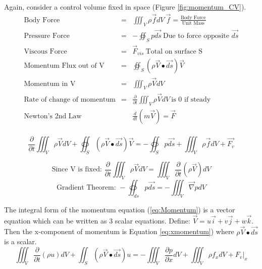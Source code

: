 \documentclass[draft=false, titlepage]{article}
\newcommand{\gradient}{\vec{\nabla}}
\newcommand{\deldelt}{\frac{\partial}{\partial t}}
\newcommand{\volumeint}{\iiint_V}
\begin{document}
Again, consider a control volume fixed in space (Figure \ref{fig:momentum_CV}).
\begin{equation*}
    \renewcommand{\arraystretch}{1.5}
    \begin{array}{rcl}
         \text{Body Force} &=& \iiint_V \rho \vec{f} dV\ \vec{f} = \frac{\text{Body Force}}{\text{Unit Mass}} \\
         
         \text{Pressure Force} &=& -\oiint_S p\vec{ds}\ \text{Due to force opposite } \vec{ds} \\
         
         \text{Viscous Force} &=& \vec{F}_{vis}\ \text{Total on surface S} \\
         
         \text{Momentum Flux out of V} &=& \oiint_S (\rho \vec{V} \bullet \vec{ds}) \vec{V} \\
         
         \text{Momentum in V} &=& \iiint_V \rho \vec{V} dV \\
         
         \text{Rate of change of momentum} &=& \deldelt \volumeint \rho \vec{V} dV\ \text{is 0 if steady} \\
         
         \text{Newton's 2nd Law} & & \frac{d}{dt}(m\vec{V}) = \vec{F} \\
    \end{array}
\end{equation*}

\begin{equation}
    \boxed{ \deldelt \volumeint \rho \vec{V} dV + \oiint_S (\rho \vec{V} \bullet \vec{ds}) \vec{V} = -\oiint_S p \vec{ds} + \volumeint \rho \vec{f} dV + \vec{F_v} }
    \label{eq:Momentum}
\end{equation}

\begin{equation*}
    \text{Since V is fixed: } \deldelt \volumeint \rho \vec{V} dV = \volumeint \deldelt (\rho \vec{V}) dV
\end{equation*}
\begin{equation*}
    \text{Gradient Theorem: } -\oiint_{ds} p\vec{ds} = -\volumeint \gradient p dV
\end{equation*}

The integral form of the momentum equation (\ref{eq:Momentum}) is a vector equation which can be written as 3 scalar equations. Define: $\vec{V} = u\vec{i} + v\vec{j} + w\vec{k}$. Then the x-component of momentum is Equation \ref{eq:xmomentum}) where $\rho \vec{V} \bullet \vec{ds}$ is a scalar.
\begin{equation}
    \volumeint \deldelt (\rho u) dV + \iint_S (\rho \vec{V} \bullet \vec{ds})u = -\volumeint \frac{\partial p}{\partial x} dV + \volumeint \rho f_x dV + F_v|_x
    \label{eq:xmomentum}
\end{equation}
\end{document}
